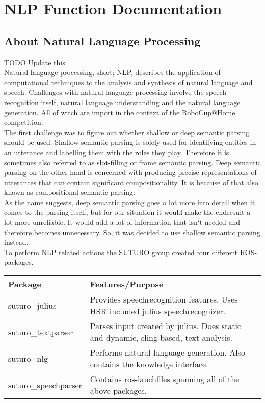 \documentclass[main.tex]{subfiles}
\begin{document}
\renewcommand{\cleardoublepage}{}   
\renewcommand{\clearpage}{}
\newpage

\chapter{NLP Function Documentation}


\section{About Natural Language Processing}
    TODO Update this\\
    Natural language processing, short; NLP, describes the application of computational techniques to the analysis and synthesis of natural language and speech. Challenges with natural language processing involve the speech recognition itself, natural language understanding and the natural language generation. All of witch are import in the context of the RoboCup@Home competition.\\ 
    The first challenge was to figure out whether shallow or deep semantic parsing should be used. Shallow semantic parsing is solely used for identifying entities in an utterance and labelling them with the roles they play. Therefore it is sometimes also referred to as slot-filling or frame semantic parsing. Deep semantic parsing on the other hand is concerned with producing precise representations of utterances that can contain significant compositionality. It is because of that also known as compositional semantic parsing.\\ 
    As the name suggests, deep semantic parsing goes a lot more into detail when it comes to the parsing itself, but for our situation it would make the endresult a lot more unreliable. It would add a lot of information that isn‘t needed and therefore becomes unnecessary. So, it was decided to use shallow semantic parsing instead.\\
    
    To perform NLP related actions the SUTURO group created four different ROS-packages.

    \begin{tabular}{|l|p{9cm}|}
        \hline
        \textbf{Package} & \textbf{Features/Purpose} \\
        \hline
        suturo\_julius & Provides speechrecognition features. Uses HSR included julius speechrecognizer. \\
        \hline 
        suturo\_textparser & Parses input created by julius. Does static and dynamic, sling based, text analysis. \\
        \hline
        suturo\_nlg & Performs natural language generation. Also contains the knowledge interface. \\
        \hline 
        suturo\_speechparser & Contains ros-lauchfiles spanning all of the above packages.\\
        \hline
    \end{tabular}
\end{document}
